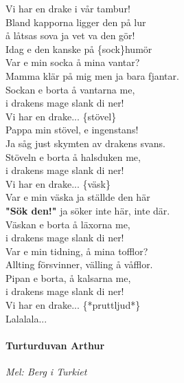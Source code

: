 \documentclass[12pt]{article}
\begin{document}
\hspace{0.05\textwidth}
\noindent
\begin{minipage}{0.45\textwidth}
	\noindent
	Vi har en drake i vår tambur!\\
	Bland kapporna ligger den på lur\\
	å låtsas sova ja vet va den gör!\\
	Idag e den kanske på \{sock\}humör\\

	\noindent
	Var e min socka å mina vantar?\\
	Mamma klär på mig men ja bara fjantar.\\
	Sockan e borta å vantarna me,\\
	i drakens mage slank di ner!\\

	Vi har en drake... \{stövel\}\\

	\noindent
	Pappa min stövel, e ingenstans!\\
	Ja såg just skymten av drakens svans.\\
	Stöveln e borta å halsduken me,\\
	i drakens mage slank di ner!\\
	
	\noindent	
	Vi har en drake... \{väsk\}\\
	
	\noindent
	Var e min väska ja ställde den här\\
	\textbf{"Sök den!"} ja söker inte här, inte där.\\
	Väskan e borta å läxorna me,\\
	i drakens mage slank di ner!\\

	\noindent
	Var e min tidning, å mina tofflor?\\
	Allting försvinner, välling å våfflor.\\
	Pipan e borta, å kalsarna me,\\
	i drakens mage slank di ner!\\

	Vi har en drake... \{*pruttljud*\}\\

	Lalalala...\\
	
	\paragraph*{Turturduvan Arthur\\}
	\vspace{3px}
	\textit{Mel: Berg i Turkiet}\\
	

\end{minipage}
\end{document}
